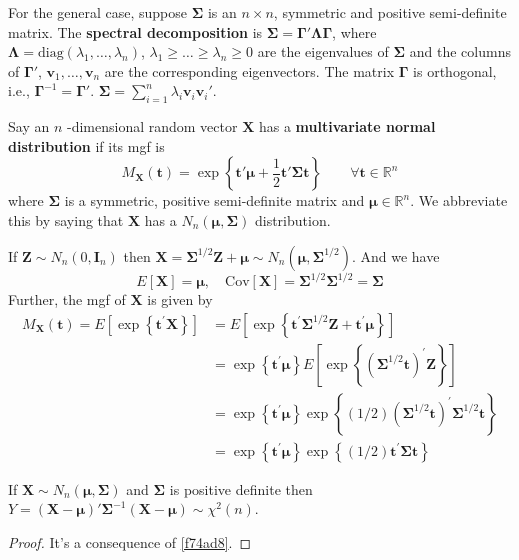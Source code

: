For the general case, suppose $\boldsymbol{\Sigma}$ is an $n\times n$, symmetric and positive semi-definite matrix. The \textbf{spectral decomposition} is $\boldsymbol{\Sigma}=\boldsymbol{\Gamma}'\boldsymbol{\Lambda}\boldsymbol{\Gamma}$, where $\boldsymbol{\Lambda}=\mathrm{diag}(\lambda_1,\dots,\lambda _n)$, $\lambda_1\geq\dots\geq\lambda _n\geq0$ are the eigenvalues of $\boldsymbol{\Sigma}$ and the columns of $\boldsymbol{\Gamma}'$, $\mathbf{v}_{1},\dots,\mathbf{v}_{n}$ are the corresponding eigenvectors. The matrix $\boldsymbol{\Gamma}$ is orthogonal, i.e., $\boldsymbol{\Gamma}^{-1}=\boldsymbol{\Gamma}'$. $\boldsymbol{\Sigma}=\sum_{i=1}^{n}\lambda _i \mathbf{v}_i \mathbf{v}_i'$.

\begin{definition}
Say an $n$ -dimensional random vector $\mathbf{X}$ has a \textbf{multivariate normal distribution} if its mgf is
\[
M_{\mathbf{X}}(\mathbf{t})=\exp \left\{  \mathbf{t}'\boldsymbol{\mu}+\frac{1}{2}\mathbf{t}'\boldsymbol{\Sigma}\mathbf{t}  \right\}\qquad \forall \mathbf{t}\in \mathbb{R}^{n}
\]
where $\boldsymbol{\Sigma}$ is a symmetric, positive semi-definite matrix and $\boldsymbol{\mu}\in \mathbb{R}^{n}$. We abbreviate this by saying that $\mathbf{X}$ has a $N_n(\boldsymbol{\mu},\boldsymbol{\Sigma})$ distribution.
\end{definition}
If $\mathbf{Z}\sim N_n(0,\mathbf{I}_n)$ then $\mathbf{X}=\boldsymbol{\Sigma}^{1/2}\mathbf{Z}+\boldsymbol{\mu}\sim N_n(\boldsymbol{\mu},\boldsymbol{\Sigma}^{1/2 })$. And we have
\[
E[\mathbf{X}]=\boldsymbol{\mu},\quad \mathrm{Cov}[\mathbf{X}]=\boldsymbol{\Sigma}^{1/2 }\boldsymbol{\Sigma}^{1/2}=\boldsymbol{\Sigma}
\]
Further, the mgf of $\mathbf{X}$ is given by
\[
\begin{aligned}
M_{\mathbf{X}}(\mathbf{t})=E\left[\exp \left\{\mathbf{t}^{\prime} \mathbf{X}\right\}\right] & =E\left[\exp \left\{\mathbf{t}^{\prime} \boldsymbol{\Sigma}^{1 / 2} \mathbf{Z}+\mathbf{t}^{\prime} \boldsymbol{\mu}\right\}\right] \\
& =\exp \left\{\mathbf{t}^{\prime} \boldsymbol{\mu}\right\} E\left[\exp \left\{\left(\boldsymbol{\Sigma}^{1 / 2} \mathbf{t}\right)^{\prime} \mathbf{Z}\right\}\right] \\
& =\exp \left\{\mathbf{t}^{\prime} \boldsymbol{\mu}\right\} \exp \left\{(1 / 2)\left(\boldsymbol{\Sigma}^{1 / 2} \mathbf{t}\right)^{\prime} \boldsymbol{\Sigma}^{1 / 2} \mathbf{t}\right\} \\
& =\exp \left\{\mathbf{t}^{\prime} \boldsymbol{\mu}\right\} \exp \left\{(1 / 2) \mathbf{t}^{\prime} \boldsymbol{\Sigma} \mathbf{t}\right\}
\end{aligned}
\]
\begin{theorem}
If $\mathbf{X}\sim N_n(\boldsymbol{\mu},\boldsymbol{\Sigma})$ and $\boldsymbol{\Sigma}$ is positive definite then $Y=(\mathbf{X}-\boldsymbol{\mu})'\boldsymbol{\Sigma}^{-1}(\mathbf{X}-\boldsymbol{\mu})\sim \chi^{2}(n)$.
\end{theorem}
\begin{proof}
It's a consequence of \cref{f74ad8}.
\end{proof}

